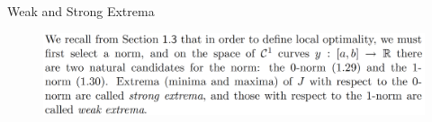 \documentclass{beamer}
\begin{document}
\begin{frame}{Weak and Strong Extrema}
\begin{figure}
        \centering
        \includegraphics[width=\linewidth]{ch2/fig7.png}
    \end{figure}
\end{frame}
\end{document}
